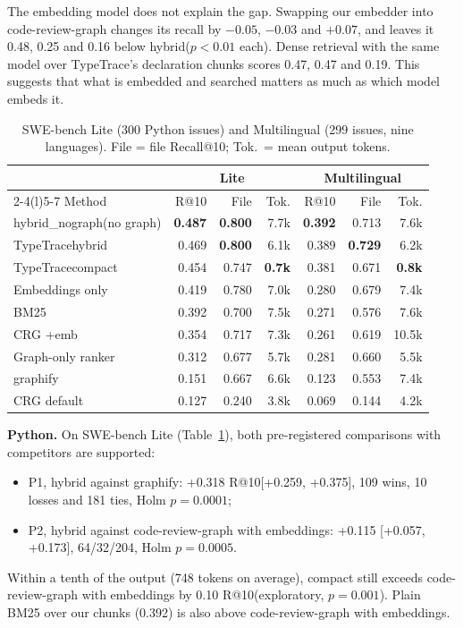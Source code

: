\documentclass[sigconf,nonacm]{acmart}
\makeatletter
\newcommand{\tool}{TypeTrace\xspace}
\newcommand{\gfy}{graphify\xspace}
\newcommand{\crg}{code-review-graph\xspace}
\newcommand{\hyb}{\textsf{hybrid}\xspace}
\newcommand{\nog}{\textsf{hybrid\_nograph}\xspace}
\newcommand{\cmp}{\textsf{compact}\xspace}
\newcommand{\rat}{R@10\xspace}
\makeatother
\begin{document}
The embedding model does not explain the gap. Swapping our embedder into \crg changes its recall by $-0.05$, $-0.03$ and $+0.07$, and leaves it 0.48, 0.25 and 0.16 below \hyb ($p < 0.01$ each). Dense retrieval with the same model over \tool's declaration chunks scores 0.47, 0.47 and 0.19. This suggests that what is embedded and searched matters as much as which model embeds it.

\begin{table}[t]
\caption{SWE-bench Lite (300 Python issues) and Multilingual (299 issues, nine languages). File = file Recall@10; Tok.\ = mean output tokens.}
\label{tab:lite}
\footnotesize
\setlength{\tabcolsep}{3.5pt}
\begin{tabular}{@{}lrrrrrr@{}}
\toprule
 & \multicolumn{3}{c}{Lite} & \multicolumn{3}{c}{Multilingual} \\
\cmidrule(lr){2-4}\cmidrule(l){5-7}
Method & \rat & File & Tok. & \rat & File & Tok. \\
\midrule
\nog (no graph) & \textbf{0.487} & \textbf{0.800} & 7.7k & \textbf{0.392} & 0.713 & 7.6k \\
\tool \hyb & 0.469 & \textbf{0.800} & 6.1k & 0.389 & \textbf{0.729} & 6.2k \\
\tool \cmp & 0.454 & 0.747 & \textbf{0.7k} & 0.381 & 0.671 & \textbf{0.8k} \\
Embeddings only & 0.419 & 0.780 & 7.0k & 0.280 & 0.679 & 7.4k \\
BM25 & 0.392 & 0.700 & 7.5k & 0.271 & 0.576 & 7.6k \\
CRG +emb & 0.354 & 0.717 & 7.3k & 0.261 & 0.619 & 10.5k \\
Graph-only ranker & 0.312 & 0.677 & 5.7k & 0.281 & 0.660 & 5.5k \\
\gfy & 0.151 & 0.667 & 6.6k & 0.123 & 0.553 & 7.4k \\
CRG default & 0.127 & 0.240 & 3.8k & 0.069 & 0.144 & 4.2k \\
\bottomrule
\end{tabular}
\end{table}

\textbf{Python.} On SWE-bench Lite (Table~\ref{tab:lite}), both pre-registered comparisons with competitors are supported:
\begin{itemize}
\item P1, \hyb against \gfy: +0.318 \rat [+0.259, +0.375], 109 wins, 10 losses and 181 ties, Holm $p = 0.0001$;
\item P2, \hyb against \crg with embeddings: +0.115 [+0.057, +0.173], 64/32/204, Holm $p = 0.0005$.
\end{itemize}
Within a tenth of the output (748 tokens on average), \cmp still exceeds \crg with embeddings by 0.10 \rat (exploratory, $p = 0.001$). Plain BM25 over our chunks (0.392) is also above \crg with embeddings.
\end{document}
